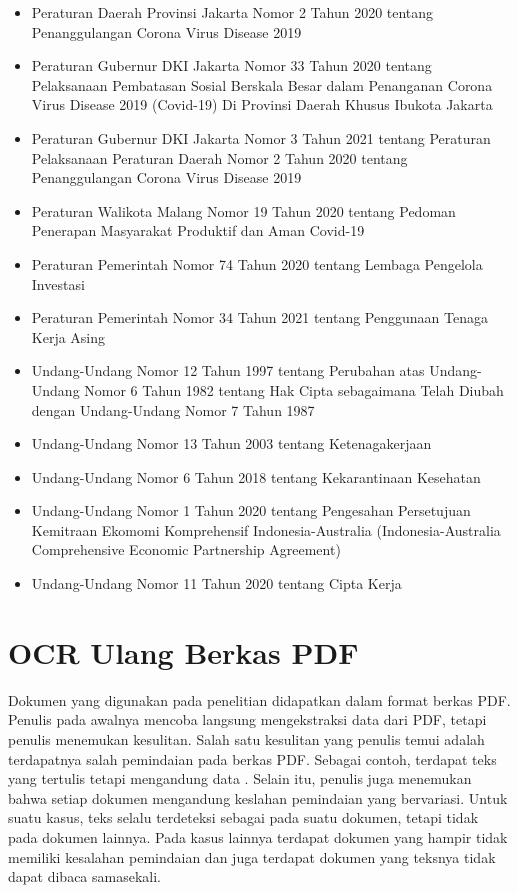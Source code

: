 \begin{itemize}
  \item Peraturan Daerah Provinsi Jakarta Nomor 2 Tahun 2020 tentang Penanggulangan Corona Virus Disease 2019
  \item Peraturan Gubernur DKI Jakarta Nomor 33 Tahun 2020 tentang Pelaksanaan Pembatasan Sosial Berskala Besar dalam Penanganan Corona Virus Disease 2019 (Covid-19) Di Provinsi Daerah Khusus Ibukota Jakarta
  \item Peraturan Gubernur DKI Jakarta Nomor 3 Tahun 2021 tentang Peraturan Pelaksanaan Peraturan Daerah Nomor 2 Tahun 2020 tentang Penanggulangan Corona Virus Disease 2019
  \item Peraturan Walikota Malang Nomor 19 Tahun 2020 tentang Pedoman Penerapan Masyarakat Produktif dan Aman Covid-19
  \item Peraturan Pemerintah Nomor 74 Tahun 2020 tentang Lembaga Pengelola Investasi
  \item Peraturan Pemerintah Nomor 34 Tahun 2021 tentang Penggunaan Tenaga Kerja Asing
  \item Undang-Undang Nomor 12 Tahun 1997 tentang Perubahan atas Undang-Undang Nomor 6 Tahun 1982 tentang Hak Cipta sebagaimana Telah Diubah dengan Undang-Undang Nomor 7 Tahun 1987
  \item Undang-Undang Nomor 13 Tahun 2003 tentang Ketenagakerjaan
  \item Undang-Undang Nomor 6 Tahun 2018 tentang Kekarantinaan Kesehatan
  \item Undang-Undang Nomor 1 Tahun 2020 tentang Pengesahan Persetujuan Kemitraan Ekomomi
  Komprehensif Indonesia-Australia (Indonesia-Australia Comprehensive Economic Partnership
  Agreement)
  \item Undang-Undang Nomor 11 Tahun 2020 tentang Cipta Kerja
\end{itemize}

\section{OCR Ulang Berkas PDF}
\label{sec:ocr-ulang-berkas-pdf}

Dokumen \legal yang digunakan pada penelitian didapatkan dalam format berkas PDF. Penulis pada
awalnya mencoba langsung mengekstraksi data dari PDF, tetapi penulis menemukan kesulitan. Salah satu
kesulitan yang penulis temui adalah terdapatnya salah pemindaian pada berkas PDF. Sebagai contoh,
terdapat teks yang tertulis  tetapi mengandung data . Selain itu, penulis
juga menemukan bahwa setiap dokumen mengandung keslahan pemindaian yang bervariasi. Untuk suatu
kasus, teks  selalu terdeteksi sebagai  pada suatu dokumen, tetapi tidak pada
dokumen lainnya. Pada kasus lainnya terdapat dokumen yang hampir tidak memiliki kesalahan pemindaian
dan juga terdapat dokumen yang teksnya tidak dapat dibaca samasekali.

